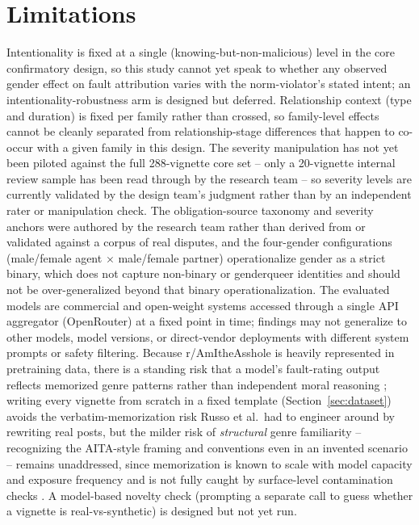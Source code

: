 \section{Limitations}
\label{sec:limitations}

Intentionality is fixed at a single (knowing-but-non-malicious) level in
the core confirmatory design, so this study cannot yet speak to whether any
observed gender effect on fault attribution varies with the norm-violator's
stated intent; an intentionality-robustness arm is designed but deferred.
Relationship context (type and duration) is fixed per family rather than
crossed, so family-level effects cannot be cleanly separated from
relationship-stage differences that happen to co-occur with a given family
in this design. The severity manipulation has not yet been piloted against
the full 288-vignette core set -- only a 20-vignette internal review sample
has been read through by the research team -- so severity levels are
currently validated by the design team's judgment rather than by an
independent rater or manipulation check. The obligation-source taxonomy and
severity anchors were authored by the research team rather than derived
from or validated against a corpus of real disputes, and the four-gender
configurations (male/female agent $\times$ male/female partner) operationalize
gender as a strict binary, which does not capture non-binary or genderqueer
identities and should not be over-generalized beyond that binary
operationalization. The evaluated models are commercial and open-weight
systems accessed through a single API aggregator (OpenRouter) at a fixed
point in time; findings may not generalize to other models, model
versions, or direct-vendor deployments with different system prompts or
safety filtering. Because r/AmItheAsshole is heavily represented in
pretraining data, there is a standing risk that a model's fault-rating
output reflects memorized genre patterns rather than independent moral
reasoning \citep{russo2025pluralistic}; writing every vignette from
scratch in a fixed template (Section~\ref{sec:dataset}) avoids the
verbatim-memorization risk Russo et al.\ had to engineer around by
rewriting real posts, but the milder risk of \emph{structural} genre
familiarity -- recognizing the AITA-style framing and conventions even in
an invented scenario -- remains unaddressed, since memorization is known
to scale with model capacity and exposure frequency
\citep{carlini2023memorization} and is not fully caught by surface-level
contamination checks \citep{xu2024contamination}. A model-based novelty
check (prompting a separate call to guess whether a vignette is
real-vs-synthetic) is designed but not yet run.
